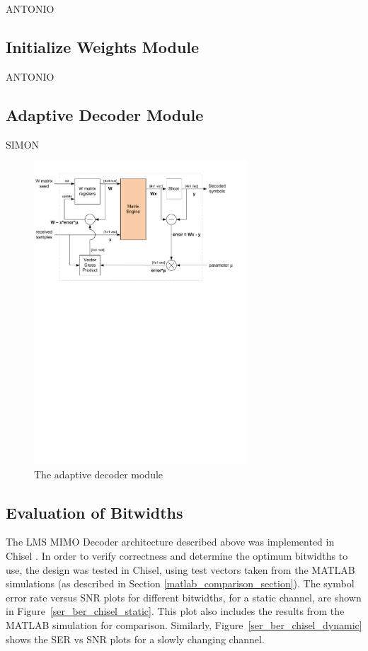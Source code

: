 \documentclass[journal]{IEEEtran}
\begin{document}
ANTONIO

\subsection{Initialize Weights Module}

ANTONIO

\subsection{Adaptive Decoder Module}

SIMON

\begin{figure}[!h]
\centering
\includegraphics*[width=8cm, viewport = 0 510 560 810]{images/adaptive_decoder.pdf}
\caption{The adaptive decoder module}
\label{adaptive_decoder}
\end{figure}

\subsection{Evaluation of Bitwidths}

The LMS MIMO Decoder architecture described above was implemented in Chisel \cite{chisel}. In order to verify correctness and determine the optimum bitwidths to use, the design was tested in Chisel, using test vectors taken from the MATLAB simulations (as described in Section \ref{matlab_comparison_section}). The symbol error rate versus SNR plots for different bitwidths, for a static channel, are shown in Figure~\ref{ser_ber_chisel_static}. This plot also includes the results from the MATLAB simulation for comparison. Similarly, Figure~\ref{ser_ber_chisel_dynamic} shows the SER vs SNR plots for a slowly changing channel.
\end{document}
